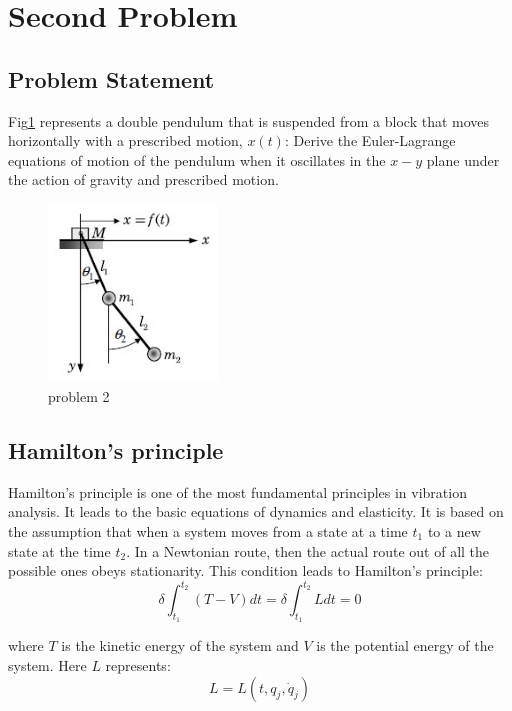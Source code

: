 \section{Second Problem}

\subsection{Problem Statement}

Fig\ref{problem 2} represents a double pendulum that is suspended from a block that moves
horizontally with a prescribed motion, $x(t)$: 
Derive the Euler-Lagrange equations of
motion of the pendulum when it oscillates in the $x-y$ plane under the action of gravity
and prescribed motion.

\begin{figure}[H]
    \centering
    \includegraphics[width=0.4\textwidth]{image/fig1.png}
    \caption{problem 2}
    \label{problem 2}
\end{figure}

\subsection{Hamilton's principle}

Hamilton's principle is one of the most fundamental principles in vibration analysis. 
It leads to the basic equations of dynamics and elasticity. It is based on the assumption that when a system moves from a state at a time 
$t_1$ to a new state at the time $t_2$. 
In a Newtonian route, 
then the actual route out of all the possible ones obeys stationarity. 
This condition leads to Hamilton's principle:
\begin{equation}
    \delta\int_{t_1}^{t_2}(T-V)dt=\delta\int_{t_1}^{t_2}Ldt = 0
\end{equation}

where $T$ is the kinetic energy of the system and $V$ is the potential energy of the system. 
Here $L$ represents:
\begin{equation}
    L=L(t,q_j,\dot{q}_j)
\end{equation}


